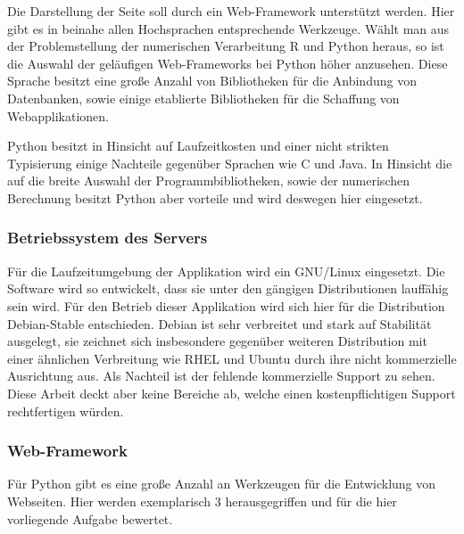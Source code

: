 Die Darstellung der Seite soll durch ein Web-\gls{Framework} unterstützt werden. Hier gibt es in beinahe allen Hochsprachen entsprechende Werkzeuge. Wählt man aus der Problemstellung der numerischen Verarbeitung R und Python heraus, so ist die Auswahl der geläufigen Web-Frameworks bei Python höher anzusehen. Diese Sprache besitzt eine große Anzahl von Bibliotheken für die Anbindung von Datenbanken, sowie einige etablierte Bibliotheken für die Schaffung von Webapplikationen.

Python besitzt in Hinsicht auf Laufzeitkosten und einer nicht strikten Typisierung einige Nachteile gegenüber Sprachen wie C und Java. In Hinsicht die auf die breite Auswahl der  Programmbibliotheken, sowie der numerischen Berechnung besitzt Python aber vorteile und wird deswegen hier eingesetzt.



\subsubsection{Betriebssystem des Servers}


Für die Laufzeitumgebung der Applikation wird ein GNU/Linux eingesetzt. Die Software wird so entwickelt, dass sie unter den gängigen Distributionen lauffähig sein wird. Für den Betrieb dieser Applikation wird sich hier für die Distribution Debian-Stable entschieden. Debian ist sehr verbreitet und stark auf Stabilität ausgelegt, sie zeichnet sich insbesondere gegenüber weiteren Distribution mit einer ähnlichen Verbreitung wie RHEL und Ubuntu durch ihre nicht kommerzielle Ausrichtung aus.  Als Nachteil ist der fehlende kommerzielle Support zu sehen. Diese Arbeit deckt aber keine Bereiche ab, welche einen kostenpflichtigen Support rechtfertigen würden.

\subsubsection{Web-Framework}

Für Python gibt es eine große Anzahl an Werkzeugen für die Entwicklung von Webseiten. Hier werden exemplarisch 3 herausgegriffen und für die hier vorliegende Aufgabe bewertet.

